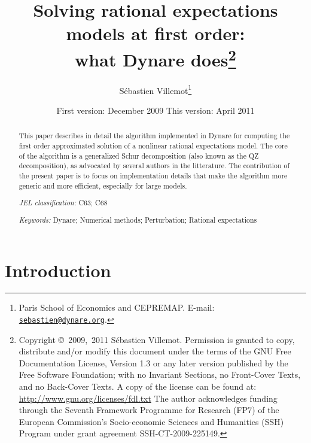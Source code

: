 \documentclass[11pt,a4paper]{article}
\begin{document}
\author{S\'ebastien Villemot\thanks{Paris School of Economics and
    CEPREMAP. E-mail:
    \href{mailto:sebastien@dynare.org}{\texttt{sebastien@dynare.org}}.}}

\title{Solving rational expectations models at first order: \\
  what Dynare does\thanks{Copyright \copyright~2009,~2011 S\'ebastien
    Villemot. Permission is granted to copy, distribute and/or modify
    this document under the terms of the GNU Free Documentation
    License, Version 1.3 or any later version published by the Free
    Software Foundation; with no Invariant Sections, no Front-Cover
    Texts, and no Back-Cover Texts. A copy of the license can be found
    at: \url{http://www.gnu.org/licenses/fdl.txt}
    \newline
    The author acknowledges funding through the Seventh Framework Programme
    for Research (FP7) of the European Commission's Socio-economic Sciences and
    Humanities (SSH) Program under grant agreement SSH-CT-2009-225149.}
}

\date{First version: December 2009 \hspace{1cm} This version: April 2011}
\maketitle

\begin{abstract}
  This paper describes in detail the algorithm implemented in Dynare for
  computing the first order approximated solution of a nonlinear rational
  expectations model. The core of the algorithm is a generalized Schur
  decomposition (also known as the QZ decomposition), as advocated by several
  authors in the litterature. The contribution of the present paper is to focus
  on implementation details that make the algorithm more generic and more
  efficient, especially for large models.

  \medskip
  \noindent
  \textit{JEL classification:} C63; C68

  \medskip
  \noindent
  \textit{Keywords:} Dynare; Numerical methods; Perturbation; Rational
  expectations

\end{abstract}

\section{Introduction}
\end{document}
